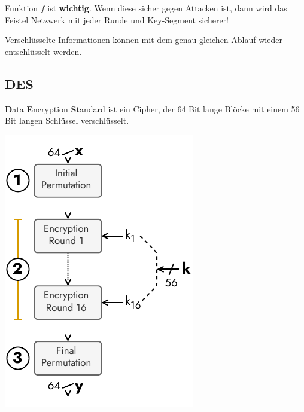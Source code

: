 \documentclass[
  10pt,
  a4paper,
  twocolumn]{article}
\begin{document}
Funktion \(f\) ist \textbf{wichtig}. Wenn diese sicher gegen Attacken
ist, dann wird das Feistel Netzwerk mit jeder Runde und Key-Segment
sicherer!

\begin{tcolorbox}[enhanced jigsaw, toprule=.15mm, opacityback=0, colbacktitle=quarto-callout-important-color!10!white, breakable, colframe=quarto-callout-important-color-frame, title=\textcolor{quarto-callout-important-color}{\faExclamation}\hspace{0.5em}{Ver- \& Entschlüsseln}, left=2mm, arc=.35mm, toptitle=1mm, bottomrule=.15mm, rightrule=.15mm, titlerule=0mm, bottomtitle=1mm, leftrule=.75mm, opacitybacktitle=0.6, coltitle=black, colback=white]

Verschlüsselte Informationen können mit dem genau gleichen Ablauf wieder
entschlüsselt werden.

\end{tcolorbox}

\subsection{\texorpdfstring{DES
\href{https://www.youtube.com/watch?v=3BZRBfhpIb0}{\color{BrickRed}\faYoutube}}{DES }}\label{des}

\textbf{D}ata \textbf{E}ncryption \textbf{S}tandard ist ein Cipher, der
64 Bit lange Blöcke mit einem 56 Bit langen Schlüssel verschlüsselt.

\begin{center}
\includegraphics{images/crypto/des.pdf}
\end{center}
\end{document}
